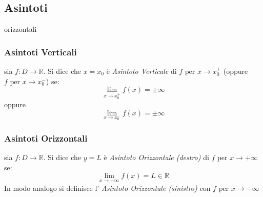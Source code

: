 \documentclass[a4paper,12pt, oneside]{book}
\begin{document}
\subsection{Asintoti} %
orizzontali
\subsubsection{Asintoti Verticali}
\begin{definizione} sia $f:D \rightarrow \mathbb{R}$. Si dice che $x=x_0$ è
  \textit{Asintoto Verticale} di $f \mbox{ per } x\rightarrow x_0^{+}$ (oppure $f
  \mbox{ per } x\rightarrow x_0^{-}$) se:
  $$\lim_{x\rightarrow x_0^{+}} f(x)= \pm \infty $$ oppure $$\lim_{x\rightarrow x_0^{-}} f(x)= \pm \infty $$
\end{definizione}
\subsubsection{Asintoti Orizzontali}
\begin{definizione} sia $f:D \rightarrow \mathbb{R}$. Si dice che $y=L$ è
  \textit{Asintoto Orizzontale (destro)} di $f \mbox{ per } x\rightarrow + \infty$
  se:
  $$\lim_{x\rightarrow + \infty} f(x)= L\in \mathbb{R} $$
  In modo analogo si definisce l' \textit{Asintoto Orizzontale (sinistro)} con
  $f \mbox{ per } x\rightarrow - \infty$
\end{definizione}
\newpage
\end{document}
